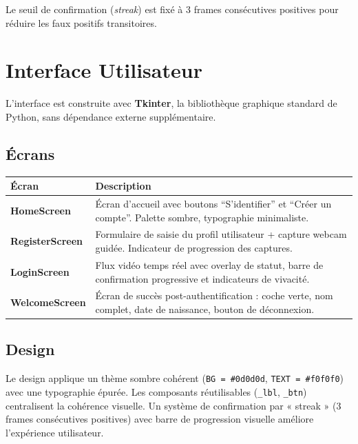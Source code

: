 \documentclass[12pt,a4paper]{article}
\begin{document}
Le seuil de confirmation (\textit{streak}) est fixé à 3 frames consécutives
positives pour réduire les faux positifs transitoires.

\section{Interface Utilisateur}

L'interface est construite avec \textbf{Tkinter}, la bibliothèque graphique
standard de Python, sans dépendance externe supplémentaire.

\subsection{Écrans}

\begin{longtable}{>{\bfseries}p{3.5cm} p{10cm}}
\toprule
Écran & Description \\
\midrule
\endhead
\bottomrule
\endfoot
HomeScreen & Écran d'accueil avec boutons ``S'identifier'' et
             ``Créer un compte''. Palette sombre, typographie minimaliste. \\[4pt]
RegisterScreen & Formulaire de saisie du profil utilisateur + capture
                 webcam guidée. Indicateur de progression des captures. \\[4pt]
LoginScreen & Flux vidéo temps réel avec overlay de statut, barre de
              confirmation progressive et indicateurs de vivacité. \\[4pt]
WelcomeScreen & Écran de succès post-authentification : coche verte, nom
                complet, date de naissance, bouton de déconnexion. \\
\end{longtable}

\subsection{Design}

Le design applique un thème sombre cohérent (\texttt{BG = \#0d0d0d},
\texttt{TEXT = \#f0f0f0}) avec une typographie épurée. Les composants
réutilisables (\texttt{\_lbl}, \texttt{\_btn}) centralisent la cohérence visuelle.
Un système de confirmation par « streak » (3 frames consécutives positives)
avec barre de progression visuelle améliore l'expérience utilisateur.
\end{document}

